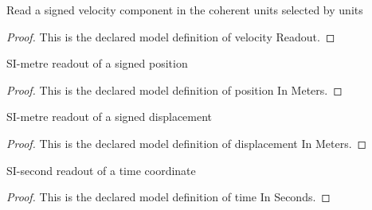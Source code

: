 \begin{definition}
  \label{def:physics:phyx-mini-0829:phyxminiproblems-problemphyxmini0829-velocityreadout}
  Read a signed velocity component in the coherent units selected by units
\end{definition}
\begin{proof}
  This is the declared model definition of velocity Readout.
\end{proof}
\begin{definition}
  \label{def:physics:phyx-mini-0829:phyxminiproblems-problemphyxmini0829-positioninmeters}
  SI-metre readout of a signed position
\end{definition}
\begin{proof}
  This is the declared model definition of position In Meters.
\end{proof}
\begin{definition}
  \label{def:physics:phyx-mini-0829:phyxminiproblems-problemphyxmini0829-displacementinmeters}
  SI-metre readout of a signed displacement
\end{definition}
\begin{proof}
  This is the declared model definition of displacement In Meters.
\end{proof}
\begin{definition}
  \label{def:physics:phyx-mini-0829:phyxminiproblems-problemphyxmini0829-timeinseconds}
  SI-second readout of a time coordinate
\end{definition}
\begin{proof}
  This is the declared model definition of time In Seconds.
\end{proof}
